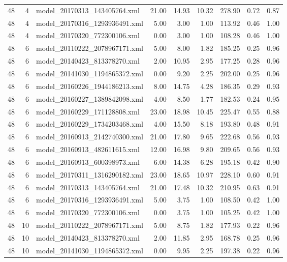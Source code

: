 \begin{table}[ht]
\begin{tabular}{rrlrrrrrr}
   48 &   4 & model\_20170313\_143405764.xml & 21.00 & 14.93 & 10.32 & 278.90 & 0.72 & 0.87 \\ 
   48 &   4 & model\_20170316\_1293936491.xml & 5.00 & 3.00 & 1.00 & 113.92 & 0.46 & 1.00 \\ 
   48 &   4 & model\_20170320\_772300106.xml & 0.00 & 3.00 & 1.00 & 108.28 & 0.46 & 1.00 \\ 
   48 &   6 & model\_20110222\_2078967171.xml & 5.00 & 8.00 & 1.82 & 185.25 & 0.25 & 0.96 \\ 
   48 &   6 & model\_20140423\_813378270.xml & 2.00 & 10.95 & 2.95 & 177.25 & 0.28 & 0.96 \\ 
   48 &   6 & model\_20141030\_1194865372.xml & 0.00 & 9.20 & 2.25 & 202.00 & 0.25 & 0.96 \\ 
   48 &   6 & model\_20160226\_1944186213.xml & 8.00 & 14.75 & 4.28 & 186.35 & 0.29 & 0.93 \\ 
   48 &   6 & model\_20160227\_1389842098.xml & 4.00 & 8.50 & 1.77 & 182.53 & 0.24 & 0.95 \\ 
   48 &   6 & model\_20160229\_171128808.xml & 23.00 & 18.98 & 10.45 & 225.47 & 0.55 & 0.88 \\ 
   48 &   6 & model\_20160229\_1734203468.xml & 4.00 & 15.50 & 8.18 & 193.80 & 0.48 & 0.91 \\ 
   48 &   6 & model\_20160913\_2142740300.xml & 21.00 & 17.80 & 9.65 & 222.68 & 0.56 & 0.93 \\ 
   48 &   6 & model\_20160913\_482611615.xml & 12.00 & 16.98 & 9.80 & 209.65 & 0.56 & 0.93 \\ 
   48 &   6 & model\_20160913\_600398973.xml & 6.00 & 14.38 & 6.28 & 195.18 & 0.42 & 0.90 \\ 
   48 &   6 & model\_20170311\_1316290182.xml & 23.00 & 18.65 & 10.97 & 228.10 & 0.60 & 0.91 \\ 
   48 &   6 & model\_20170313\_143405764.xml & 21.00 & 17.48 & 10.32 & 210.95 & 0.63 & 0.91 \\ 
   48 &   6 & model\_20170316\_1293936491.xml & 5.00 & 3.75 & 1.00 & 108.50 & 0.42 & 1.00 \\ 
   48 &   6 & model\_20170320\_772300106.xml & 0.00 & 3.75 & 1.00 & 105.25 & 0.42 & 1.00 \\ 
   48 &  10 & model\_20110222\_2078967171.xml & 5.00 & 8.75 & 1.82 & 177.93 & 0.22 & 0.96 \\ 
   48 &  10 & model\_20140423\_813378270.xml & 2.00 & 11.85 & 2.95 & 168.78 & 0.25 & 0.96 \\ 
   48 &  10 & model\_20141030\_1194865372.xml & 0.00 & 9.95 & 2.25 & 197.38 & 0.22 & 0.96 \\ 

\end{tabular}
\end{table}
